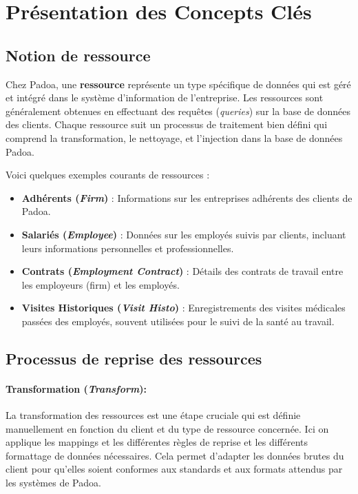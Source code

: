 \section{Présentation des Concepts Clés}

\subsection{Notion de ressource}

Chez Padoa, une \textbf{ressource} représente un type spécifique de données qui est géré et intégré dans le système d'information de l'entreprise. Les ressources sont généralement obtenues en effectuant des requêtes (\emph{queries}) sur la base de données des clients. Chaque ressource suit un processus de traitement bien défini qui comprend la transformation, le nettoyage, et l'injection dans la base de données Padoa.

Voici quelques exemples courants de ressources :

\begin{itemize}
    \item \textbf{Adhérents (\emph{Firm})} : Informations sur les entreprises adhérents des clients de Padoa.
    \item \textbf{Salariés (\emph{Employee})} : Données sur les employés suivis par clients, incluant leurs informations personnelles et professionnelles.
    \item \textbf{Contrats (\emph{Employment Contract})} : Détails des contrats de travail entre les employeurs (firm) et les employés.
    \item \textbf{Visites Historiques (\emph{Visit Histo})} : Enregistrements des visites médicales passées des employés, souvent utilisées pour le suivi de la santé au travail.
\end{itemize}

\subsection{Processus de reprise des ressources}

\paragraph{Transformation (\emph{Transform}):}
La transformation des ressources est une étape cruciale qui est définie manuellement en fonction du client et du type de ressource concernée. Ici on applique les mappings et les différentes règles de reprise et les différents formattage de données nécessaires. Cela permet d'adapter les données brutes du client pour qu'elles soient conformes aux standards et aux formats attendus par les systèmes de Padoa.

